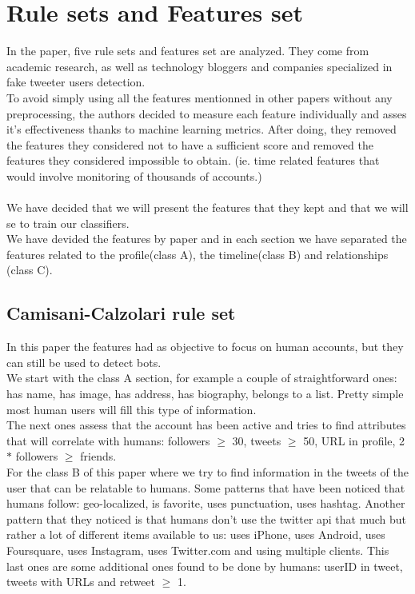 \documentclass[a4paper,11pt]{article}
\begin{document}
\section{Rule sets and Features set}
In the paper, five rule sets and features set are analyzed. They come from  academic research, as well as technology bloggers and companies specialized in fake tweeter users detection.\\

To avoid simply using all the features mentionned in other papers without any preprocessing, the authors decided to measure each feature individually and asses it's effectiveness thanks to machine learning metrics. After doing, they removed the features they considered not to have a sufficient score and removed the features they considered impossible to obtain. (ie. time related features that would involve monitoring of thousands of accounts.)
\\\\
We have decided that we will present the features that they kept and that we will se to train our classifiers.\\
We have devided the features by paper and in each section we have separated the features related to the profile(class A), the timeline(class B) and relationships (class C).

\subsection{Camisani-Calzolari rule set}
In this paper the features had as objective to focus on human accounts, but they can still be used to detect bots. \\
We start with the class A section, for example a couple of straightforward ones: has name, has image, has address, has biography, belongs to a list.
Pretty simple most human users will fill this type of information.\\
The next ones assess that the account has been active and tries to find attributes that will correlate with humans: followers $\geq$ 30, tweets $\geq$ 50, URL
in profile, 2 $*$ followers $\geq$ friends.\\
For the class B of this paper where we try to find information in the tweets of the user that can be relatable to humans. Some patterns that have been noticed that humans follow: geo-localized, is favorite, uses punctuation, uses hashtag. Another pattern that they noticed is that humans don't use the twitter api that much but rather a lot of different items available to us: uses iPhone, uses Android, uses Foursquare, uses Instagram, uses Twitter.com and using multiple clients. This last ones are some additional ones found to be done by humans: userID in tweet,
tweets with URLs and retweet $\geq$ 1. 
\end{document}

